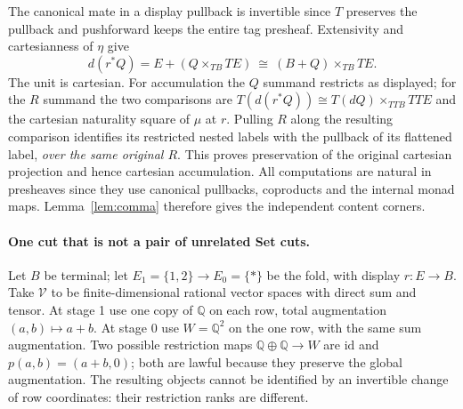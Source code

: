 \documentclass[11pt]{article}
\theoremstyle{definition}\newtheorem{definition}[theorem]{Definition}
\newcommand{\V}{\mathcal V}\newcommand{\Set}{\mathsf{Set}}\newcommand{\Cat}{\mathsf{Cat}}
\newcommand{\id}{\mathrm{id}}\newcommand{\op}{\mathrm{op}}\newcommand{\dom}{\mathrm{dom}}
\begin{document}
The canonical mate in a display pullback is invertible since $T$
preserves the pullback and pushforward keeps the entire tag presheaf.
Extensivity and cartesianness of $\eta$ give
\[
 d(r^*Q)=E+(Q\times_{TB}TE)
                  \ \cong\ (B+Q)\times_{TB}TE .
\]
The unit is cartesian. For accumulation the $Q$ summand restricts
as displayed; for the $R$ summand the two comparisons are
$T(d(r^*Q))\cong T(dQ)\times_{TTB}TTE$ and the cartesian
naturality square of $\mu$ at $r$. Pulling $R$ along the resulting
comparison identifies its restricted nested labels with the pullback
of its flattened label, \emph{over the same original $R$}. This proves
preservation of the original cartesian projection and hence cartesian
accumulation. All computations are natural in presheaves since they
use canonical pullbacks, coproducts and the internal monad maps.
Lemma~\ref{lem:comma} therefore gives the independent content corners.

\paragraph{One cut that is not a pair of unrelated Set cuts.}
Let $B$ be terminal; let $E_1=\{1,2\}\to E_0=\{*\}$ be the fold,
with display $r:E\to B$. Take $\V$ to be finite-dimensional rational
vector spaces with direct sum and tensor. At stage 1 use one copy
of $\mathbb Q$ on each row, total augmentation $(a,b)\mapsto a+b$.
At stage 0 use $W=\mathbb Q^2$ on the one row, with the same sum
augmentation. Two possible restriction maps $\mathbb Q\oplus\mathbb Q
\to W$ are $\id$ and $p(a,b)=(a+b,0)$; both are lawful because they
preserve the global augmentation. The resulting objects cannot be
identified by an invertible change of row coordinates: their
restriction ranks are different.
\end{document}
